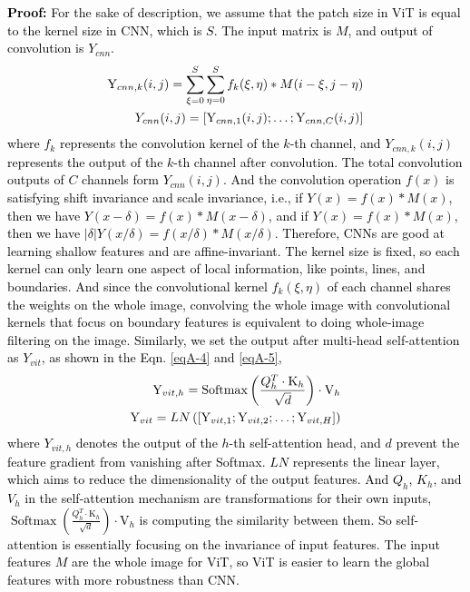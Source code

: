 \documentclass[lettersize,journal]{IEEEtran}
\begin{document}
\textcolor{black}{\textbf{Proof:} For the sake of description, we assume that the patch size in ViT is equal to the kernel size in CNN, which is $S$. The input matrix is $M$, and output of convolution is $Y_{cnn}$.
\vspace{-2mm}
\begin{eqnarray}
    \mathrm{Y}_{cnn,k}(i, j)=\sum_{\xi=0}^{S} \sum_{\eta=0}^{S} f_{k}(\xi, \eta) * M(i-\xi, j-\eta)\\
   {Y}_{c n n}(i, j)=\left[\mathrm{Y}_{c n n, 1}(i, j) ;  \ldots ; \mathrm{Y}_{c n n, C}(i, j)\right]
   \setlength{\belowdisplayskip}{0pt}
\end{eqnarray}
where $f_{k}$ represents the convolution kernel of the $k$-th channel, and $Y_{cnn,k} (i,j)$ represents the output of the $k$-th channel after convolution. The total convolution outputs of $C$ channels form $Y_{cnn}(i,j)$. And the convolution operation $f(x)$ is satisfying shift invariance and scale invariance, i.e., if $Y(x)=f(x)*M(x)$, then we have $Y(x-\delta)=f(x)*M(x-\delta)$, and if $Y(x)=f(x)*M(x)$, then we have $|\delta|Y(x/\delta)=f(x/\delta)*M(x/\delta)$. Therefore, CNNs are good at learning shallow features and are affine-invariant. The kernel size is fixed, so each kernel can only learn one aspect of local information, like points, lines, and boundaries. And since the convolutional kernel $f_{k}(\xi, \eta)$ of each channel shares the weights on the whole image, convolving the whole image with convolutional kernels that focus on boundary features is equivalent to doing whole-image filtering on the image. Similarly, we set the output after multi-head self-attention as $Y_{vit}$, as shown in the Eqn. \ref{eqA-4} and \ref{eqA-5},
   \vspace{-1mm}
    \begin{eqnarray}
\mathrm{Y}_{v i t, h}=\operatorname{Softmax}\left(\frac{Q_{h}^{T} \cdot \mathrm{K}_{h}}{\sqrt{d}}\right) \cdot \mathrm{V}_{h}  
    \label{eqA-4}\\\vspace{-1mm}
    \mathrm{Y}_{v i t}=L N\left(\left[\mathrm{Y}_{v i t, 1} ; \mathrm{Y}_{v i t, 2} ; \ldots ; \mathrm{Y}_{v i t, H}\right]\right)
       \setlength{\belowdisplayskip}{2pt}
    \label{eqA-5}
    \end{eqnarray}
where ${Y}_{v i t, h}$ denotes the output of the $h$-th self-attention head, and $d$ prevent the feature gradient from vanishing after Softmax. $LN$ represents the linear layer, which aims to reduce the dimensionality of the output features. And $Q_{h}$, $K_{h}$, and $V_{h}$ in the self-attention mechanism are transformations for their own inputs, $\operatorname{Softmax}\left(\frac{Q_{h}^{T} \cdot \mathrm{K}_{h}}{\sqrt{d}}\right) \cdot \mathrm{V}_{h}$ is computing the similarity between them. So self-attention is essentially focusing on the invariance of input features. The input features $M$ are the whole image for ViT, so ViT is easier to learn the global features with more robustness than CNN.}
\end{document}
